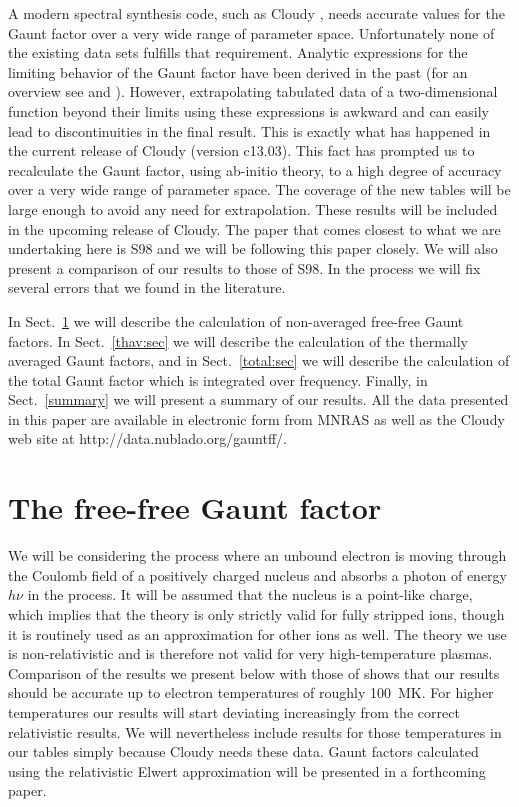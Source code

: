 \documentclass[useAMS,usenatbib]{mn2e}
\begin{document}
A modern spectral synthesis code, such as Cloudy \citep{Fe13}, needs accurate
values for the Gaunt factor over a very wide range of parameter space.
Unfortunately none of the existing data sets fulfills that requirement.
Analytic expressions for the limiting behavior of the Gaunt factor have been
derived in the past (for an overview see \citealp{Hu88} and \citealp{Be00}).
However, extrapolating tabulated data of a two-dimensional function beyond
their limits using these expressions is awkward and can easily lead to
discontinuities in the final result. This is exactly what has happened in the
current release of Cloudy (version c13.03). This fact has prompted us to
recalculate the Gaunt factor, using ab-initio theory, to a high degree of
accuracy over a very wide range of parameter space. The coverage of the new
tables will be large enough to avoid any need for extrapolation. These results
will be included in the upcoming release of Cloudy. The paper that comes
closest to what we are undertaking here is S98 and we will be following this
paper closely. We will also present a comparison of our results to those of
S98. In the process we will fix several errors that we found in the
literature.

In Sect.~\ref{sec:gff} we will describe the calculation of non-averaged
free-free Gaunt factors. In Sect.~\ref{thav:sec} we will describe the
calculation of the thermally averaged Gaunt factors, and in
Sect.~\ref{total:sec} we will describe the calculation of the total Gaunt
factor which is integrated over frequency. Finally, in Sect.~\ref{summary} we
will present a summary of our results. All the data presented in this paper
are available in electronic form from MNRAS as well as the Cloudy web site at
http://data.nublado.org/gauntff/.

\section{The free-free Gaunt factor}
\label{sec:gff}

We will be considering the process where an unbound electron is moving through
the Coulomb field of a positively charged nucleus and absorbs a photon of
energy $h\nu$ in the process. It will be assumed that the nucleus is a
point-like charge, which implies that the theory is only strictly valid for
fully stripped ions, though it is routinely used as an approximation for other
ions as well. The theory we use is non-relativistic and is therefore not valid
for very high-temperature plasmas. Comparison of the results we present below
with those of \citet{No98} shows that our results should be accurate up to
electron temperatures of roughly 100~MK. For higher temperatures our results
will start deviating increasingly from the correct relativistic results. We
will nevertheless include results for those temperatures in our tables simply
because Cloudy needs these data. Gaunt factors calculated using the
relativistic Elwert approximation will be presented in a forthcoming paper.
\end{document}
